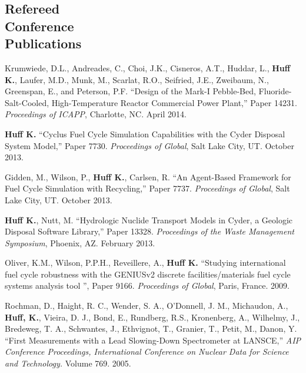 \documentclass[margin,line]{resume}
\begin{document}
\begin{resume}
    \section{\mysidestyle Refereed\\Conference\\Publications}
    \begin{bibenum} 
      \item Krumwiede, D.L., Andreades, C., Choi, J.K., Cisneros, A.T., Huddar, L.,
         \textbf{Huff K.}, Laufer, M.D., Munk, M., Scarlat, R.O., Seifried, J.E.,
         Zweibaum, N., Greenspan, E., and Peterson, P.F.  ``Design of the Mark-I
         Pebble-Bed, Fluoride-Salt-Cooled, High-Temperature Reactor Commercial Power
         Plant,'' Paper 14231.  \emph{Proceedings of ICAPP}, Charlotte, NC. April 2014.  
      \item \textbf{Huff K.} ``Cyclus Fuel Cycle Simulation Capabilities with the Cyder Disposal System Model,'' Paper 7730.
         \emph{Proceedings of Global}, Salt Lake City, UT. October 2013. 
      \item Gidden, M., Wilson, P., \textbf{Huff K.}, Carlsen, R. ``An Agent-Based Framework for Fuel Cycle Simulation with Recycling,'' Paper 7737.
         \emph{Proceedings of Global}, Salt Lake City, UT. October 2013. 
      \item \textbf{Huff K.}, Nutt, M. ``Hydrologic Nuclide Transport Models in Cyder, a Geologic Disposal Software Library,'' Paper 13328.
         \emph{Proceedings of the Waste Management Symposium}, Phoenix, AZ.  February 2013. 
      \item Oliver, K.M., Wilson, P.P.H., Reveillere, A., \textbf{Huff K.} ``Studying international fuel cycle robustness with the GENIUSv2 discrete 
          facilities/materials fuel cycle systems analysis tool	'', Paper 9166. 
          \emph{Proceedings of Global}, Paris, France. 2009.
      \item Rochman, D., Haight, R. C., Wender, S. A., O'Donnell, J. M., 
        Michaudon, A., \textbf{Huff, K.}, Vieira, D. J., Bond, E., Rundberg, R.S., 
        Kronenberg, A., Wilhelmy, J., Bredeweg, T. A., Schwantes, J., Ethvignot, T., 
        Granier, T., Petit, M., Danon, Y. 
        ``First Measurements with a Lead Slowing-Down Spectrometer at LANSCE,'' 
        \emph{AIP Conference Proceedings, International Conference on Nuclear 
        Data for Science and Technology.} Volume 769. 2005.
    \end{bibenum}

\end{resume}
\end{document}
